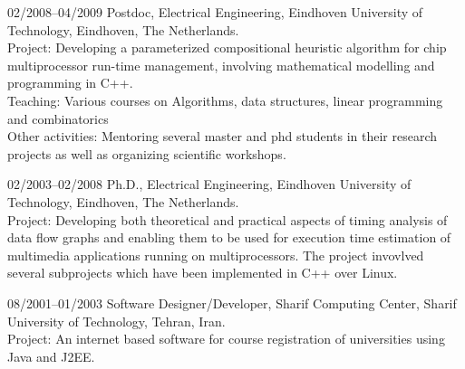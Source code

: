 \begin{CV}
\item[02/2008--04/2009] Postdoc, Electrical Engineering, Eindhoven University
of Technology, Eindhoven, The Netherlands. \\
\ifindustry
Project: Developing a parameterized compositional heuristic algorithm for chip multiprocessor run-time management, involving mathematical modelling and programming in C++.\\
Teaching: Various courses on Algorithms, data structures, linear programming and combinatorics \\
Other activities: Mentoring several master and phd students in their research projects as well as organizing scientific workshops.
\fi

\item[02/2003--02/2008] Ph.D., Electrical Engineering, Eindhoven
University of Technology, Eindhoven, The Netherlands.\\
\ifindustry
Project: Developing both theoretical and practical aspects of timing analysis of data flow graphs
and enabling them to be used for execution time estimation of multimedia applications running on multiprocessors.
The project invovlved several subprojects which have been implemented in C++ over Linux.
\fi

\item[08/2001--01/2003] Software Designer/Developer, Sharif Computing Center, Sharif University of Technology, Tehran,
Iran.\\
\ifindustry
Project: An internet based software for course registration of universities using Java and J2EE.
\fi
\end{CV}
